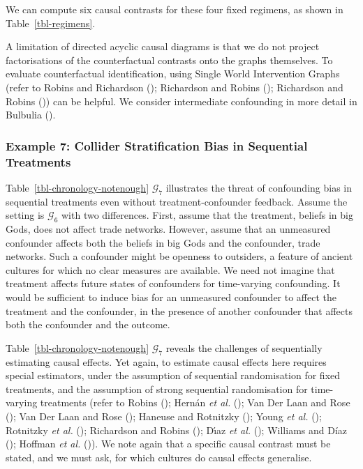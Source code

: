 \documentclass[
  single column]{article}
\begin{document}
We can compute six causal contrasts for these four fixed regimens, as
shown in Table~\ref{tbl-regimens}.

A limitation of directed acyclic causal diagrams is that we do not
project factorisations of the counterfactual contrasts onto the graphs
themselves. To evaluate counterfactual identification, using Single
World Intervention Graphs (refer to Robins and Richardson
(); Richardson and Robins
(); Richardson and Robins
()) can be helpful. We
consider intermediate confounding in more detail in Bulbulia
().

\subsubsection{Example 7: Collider Stratification Bias in Sequential
Treatments}\label{example-7-collider-stratification-bias-in-sequential-treatments}

Table~\ref{tbl-chronology-notenough} \(\mathcal{G}_7\) illustrates the
threat of confounding bias in sequential treatments even without
treatment-confounder feedback. Assume the setting is \(\mathcal{G}_6\)
with two differences. First, assume that the treatment, beliefs in big
Gods, does not affect trade networks. However, assume that an unmeasured
confounder affects both the beliefs in big Gods and the confounder,
trade networks. Such a confounder might be openness to outsiders, a
feature of ancient cultures for which no clear measures are available.
We need not imagine that treatment affects future states of confounders
for time-varying confounding. It would be sufficient to induce bias for
an unmeasured confounder to affect the treatment and the confounder, in
the presence of another confounder that affects both the confounder and
the outcome.

Table~\ref{tbl-chronology-notenough} \(\mathcal{G}_7\) reveals the
challenges of sequentially estimating causal effects. Yet again, to
estimate causal effects here requires special estimators, under the
assumption of sequential randomisation for fixed treatments, and the
assumption of strong sequential randomisation for time-varying
treatments (refer to Robins (); Hernán
\emph{et al.} (); Van Der Laan
and Rose (); Van Der Laan and Rose
(); Haneuse and Rotnitzky
(); Young \emph{et al.}
(); Rotnitzky \emph{et al.}
(); Richardson and Robins
(); Dı́az \emph{et al.}
(); Williams and Díaz
(); Hoffman \emph{et al.}
()). We note again that a specific
causal contrast must be stated, and we must ask, for which cultures do
causal effects generalise.
\end{document}
